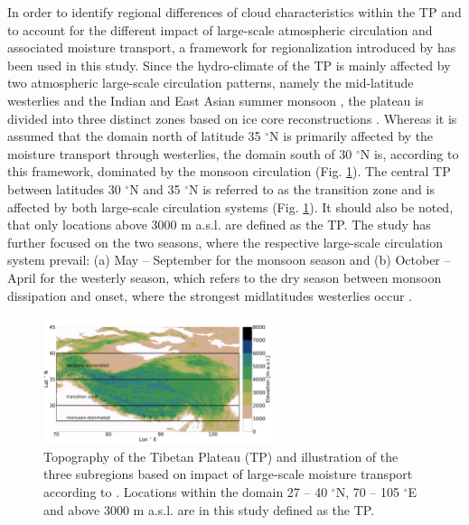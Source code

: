 \documentclass[alpha-refs]{wiley-article}
\begin{document}
In order to identify regional differences of cloud characteristics within the TP and to account for the different impact of large-scale atmospheric circulation and associated moisture transport, a framework for regionalization introduced by \citet{cu13_2} has been used in this study. Since the hydro-climate of the TP is mainly affected by two atmospheric large-scale circulation patterns, namely the mid-latitude westerlies and the Indian and East Asian summer monsoon \citep{cu13_2, largescale2016}, the plateau is divided into three distinct zones based on ice core reconstructions \citep{cu13_2}. Whereas it is assumed that the domain north of latitude 35 $^{\circ}$N is primarily affected by the moisture transport through westerlies, the domain south of 30 $^{\circ}$N is, according to this framework, dominated by the monsoon circulation (Fig. \ref{fig:dem_tp_regimes}). The central TP between latitudes 30 $^{\circ}$N and 35 $^{\circ}$N is referred to as the transition zone and is affected by both large-scale circulation systems (Fig. \ref{fig:dem_tp_regimes}). It should also be noted, that only locations above 3000 m a.s.l. are defined as the TP. The study has further focused on the two seasons, where the respective large-scale circulation system prevail: (a) May -- September for the monsoon season \citep{monsoon_season_def2002} and (b) October -- April for the westerly season, which refers to the dry season between monsoon dissipation and onset, where the strongest midlatitudes westerlies occur \citep{largescale2016}.


\begin{figure}[!htbp]
\centering
\includegraphics[width=0.6\textwidth]{DEM_TP_regimes.png}
\caption{Topography of the Tibetan Plateau (TP) and illustration of the three subregions based on impact of large-scale moisture transport according to \citet{cu13_2}. Locations within the domain 27 -- 40 $^{\circ}$N, 70 -- 105 $^{\circ}$E and above 3000 m a.s.l. are in this study defined as the TP.}
\label{fig:dem_tp_regimes}
\end{figure}
\end{document}

